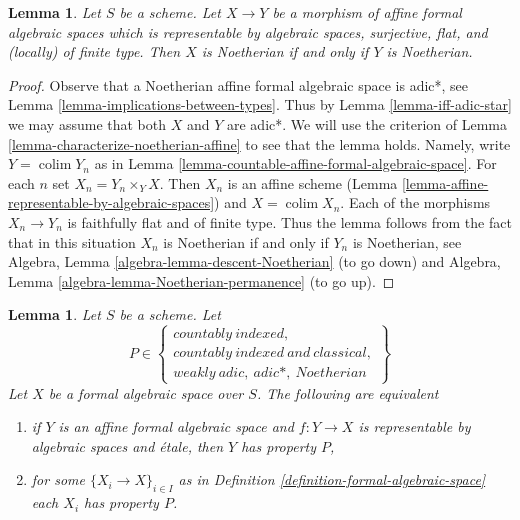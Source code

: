 \documentclass{stacks-project}
\theoremstyle{plain}
\newtheorem{lemma}[subsection]{Lemma}
\theoremstyle{definition}
\theoremstyle{remark}
\numberwithin{equation}{subsection}
\def\colim{\mathop{\mathrm{colim}}\nolimits}
\begin{document}
\begin{lemma}
\label{lemma-iff-noetherian}
Let $S$ be a scheme. Let $X \to Y$ be a morphism of affine
formal algebraic spaces which is representable by algebraic spaces,
surjective, flat, and (locally) of finite type. Then $X$ is Noetherian
if and only if $Y$ is Noetherian.
\end{lemma}

\begin{proof}
Observe that a Noetherian affine formal algebraic space is adic*, see
Lemma \ref{lemma-implications-between-types}. Thus by
Lemma \ref{lemma-iff-adic-star} we may assume that both $X$ and $Y$
are adic*. We will use the criterion of
Lemma \ref{lemma-characterize-noetherian-affine}
to see that the lemma holds. Namely, write $Y = \colim Y_n$
as in Lemma \ref{lemma-countable-affine-formal-algebraic-space}.
For each $n$ set $X_n = Y_n \times_Y X$. Then $X_n$ is an
affine scheme (Lemma \ref{lemma-affine-representable-by-algebraic-spaces})
and $X = \colim X_n$. Each of the morphisms $X_n \to Y_n$ is
faithfully flat and of finite type. Thus the lemma follows from the
fact that in this situation $X_n$ is Noetherian if and only if $Y_n$
is Noetherian, see
Algebra, Lemma \ref{algebra-lemma-descent-Noetherian} (to go down)
and
Algebra, Lemma \ref{algebra-lemma-Noetherian-permanence} (to go up).
\end{proof}

\begin{lemma}
\label{lemma-type-local}
Let $S$ be a scheme. Let
$$
P \in
\left\{
\begin{matrix}
countably\ indexed,\\
countably\ indexed\ and\ classical,\\
weakly\ adic,\ adic*,\ Noetherian
\end{matrix}
\right\}
$$
Let $X$ be a formal algebraic space over $S$.
The following are equivalent
\begin{enumerate}
\item if $Y$ is an affine formal algebraic space and
$f : Y \to X$ is representable by algebraic spaces and \'etale,
then $Y$ has property $P$,
\item for some $\{X_i \to X\}_{i \in I}$ as in
Definition \ref{definition-formal-algebraic-space}
each $X_i$ has property $P$.
\end{enumerate}
\end{lemma}
\end{document}
